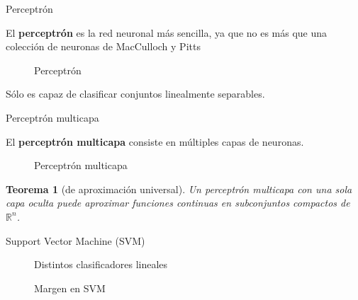\documentclass[hyperref={unicode}]{beamer}
\newtheorem{teo}{\textbf{\color{ExecusharesBlue}Teorema}}
\begin{document}
\begin{frame}{Perceptrón}

El \textbf{perceptrón} es la red neuronal más sencilla, ya que no es más que una colección de neuronas de MacCulloch y Pitts

\begin{figure}[htbp!]
	\centering
	\resizebox{!}{0.35\textwidth}{\perceptron}
	\caption{Perceptrón}
\end{figure}

Sólo es capaz de clasificar conjuntos linealmente separables.
	
\end{frame}



\begin{frame}{Perceptrón multicapa}
 
El \textbf{perceptrón multicapa} consiste en múltiples capas de neuronas.

\begin{figure}[htbp!]
	\centering
	\resizebox{!}{0.3\textwidth}{\perceptronmulticapa}
	\caption{Perceptrón multicapa}
\end{figure}

\begin{teo}[de aproximación universal]
	Un perceptrón multicapa con una sola capa oculta puede aproximar funciones continuas en subconjuntos compactos de $\mathbb{R}^n$.
\end{teo}

\end{frame}

\begin{frame}{Support Vector Machine (SVM)}
	
	\begin{minipage}[b][.50\textheight][t]{.47\textwidth}
		\begin{figure}[htbp!]
			\centering
			\resizebox{!}{0.8\textwidth}{\clasificador}
			\caption{Distintos clasificadores lineales}
			\label{fig:clasificador}
		\end{figure}
	\end{minipage}\hfill%
	\begin{minipage}[b][.50\textheight][t]{.47\textwidth}
		\begin{figure}[htbp!]
			\centering
			\resizebox{!}{0.9\textwidth}{\margen}
			\caption{Margen en SVM}
			\label{fig:margen}
		\end{figure}
	\end{minipage}
	
	
\end{frame}
\end{document}
